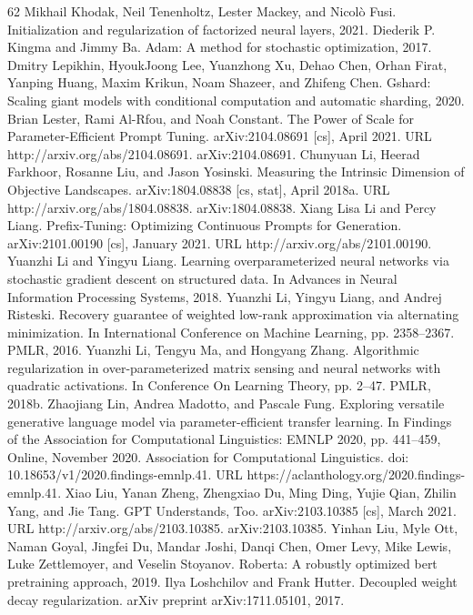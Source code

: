 \documentclass[conference]{IEEEtran}
\begin{document}
\begin{thebibliography}{62}
 Mikhail Khodak, Neil Tenenholtz, Lester Mackey, and Nicolò Fusi. Initialization and regularization of factorized neural layers, 2021.
 Diederik P. Kingma and Jimmy Ba. Adam: A method for stochastic optimization, 2017.
 Dmitry Lepikhin, HyoukJoong Lee, Yuanzhong Xu, Dehao Chen, Orhan Firat, Yanping Huang, Maxim Krikun, Noam Shazeer, and Zhifeng Chen. Gshard: Scaling giant models with conditional computation and automatic sharding, 2020.
 Brian Lester, Rami Al-Rfou, and Noah Constant. The Power of Scale for Parameter-Efficient Prompt Tuning. arXiv:2104.08691 [cs], April 2021. URL http://arxiv.org/abs/2104.08691. arXiv:2104.08691.
 Chunyuan Li, Heerad Farkhoor, Rosanne Liu, and Jason Yosinski. Measuring the Intrinsic Dimension of Objective Landscapes. arXiv:1804.08838 [cs, stat], April 2018a. URL http://arxiv.org/abs/1804.08838. arXiv:1804.08838.
 Xiang Lisa Li and Percy Liang. Prefix-Tuning: Optimizing Continuous Prompts for Generation. arXiv:2101.00190 [cs], January 2021. URL http://arxiv.org/abs/2101.00190.
 Yuanzhi Li and Yingyu Liang. Learning overparameterized neural networks via stochastic gradient descent on structured data. In Advances in Neural Information Processing Systems, 2018.
 Yuanzhi Li, Yingyu Liang, and Andrej Risteski. Recovery guarantee of weighted low-rank approximation via alternating minimization. In International Conference on Machine Learning, pp. 2358–2367. PMLR, 2016.
 Yuanzhi Li, Tengyu Ma, and Hongyang Zhang. Algorithmic regularization in over-parameterized matrix sensing and neural networks with quadratic activations. In Conference On Learning Theory, pp. 2–47. PMLR, 2018b.
 Zhaojiang Lin, Andrea Madotto, and Pascale Fung. Exploring versatile generative language model via parameter-efficient transfer learning. In Findings of the Association for Computational Linguistics: EMNLP 2020, pp. 441–459, Online, November 2020. Association for Computational Linguistics. doi: 10.18653/v1/2020.findings-emnlp.41. URL https://aclanthology.org/2020.findings-emnlp.41.
 Xiao Liu, Yanan Zheng, Zhengxiao Du, Ming Ding, Yujie Qian, Zhilin Yang, and Jie Tang. GPT Understands, Too. arXiv:2103.10385 [cs], March 2021. URL http://arxiv.org/abs/2103.10385. arXiv:2103.10385.
 Yinhan Liu, Myle Ott, Naman Goyal, Jingfei Du, Mandar Joshi, Danqi Chen, Omer Levy, Mike Lewis, Luke Zettlemoyer, and Veselin Stoyanov. Roberta: A robustly optimized bert pretraining approach, 2019.
 Ilya Loshchilov and Frank Hutter. Decoupled weight decay regularization. arXiv preprint arXiv:1711.05101, 2017.

\end{thebibliography}
\end{document}
